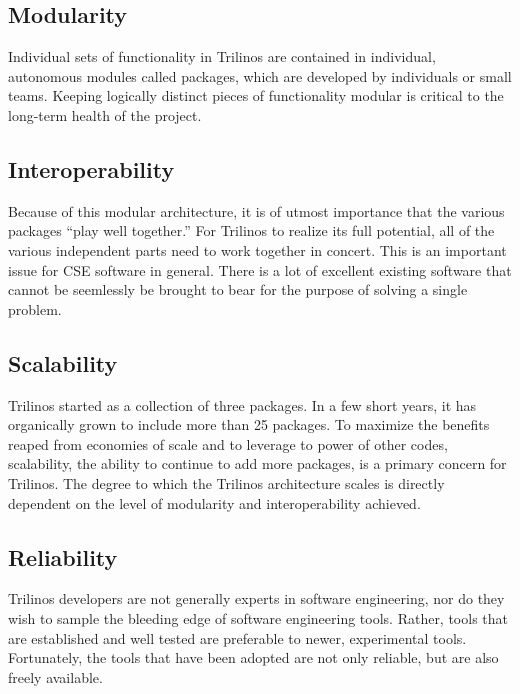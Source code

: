 \documentclass[12pt,relax]{article}
\begin{document}
\subsection{Modularity}
Individual sets of functionality in Trilinos are contained in individual,
autonomous modules called packages, which are developed by individuals or small
teams.  Keeping logically distinct pieces of functionality modular is critical
to the long-term health of the project.  

\subsection{Interoperability}
Because of this modular architecture, it is of utmost importance that the
various packages ``play well together.''  For Trilinos to realize its full
potential, all of the various independent parts need to work together in
concert.  This is an important issue for CSE software in general.  There 
is a lot of excellent existing software that cannot be seemlessly be 
brought to bear for the purpose of solving a single problem.

\subsection{Scalability}
Trilinos started as a collection of three packages.  In a few short years, it
has organically grown to include more than 25 packages.  To maximize the
benefits reaped from economies of scale and to leverage to power of other
codes, scalability, the ability to continue to add more packages, is a primary
concern for Trilinos.  The degree to which the Trilinos architecture scales
is directly dependent on the level of modularity and interoperability achieved.

\subsection{Reliability}
Trilinos developers are not generally experts in software engineering, nor do
they wish to sample the bleeding edge of software engineering 
tools.  Rather, tools that are established and well tested are preferable
to newer, experimental tools.  Fortunately, the tools that have been adopted 
are not only reliable, but are also freely available.

\end{document}
